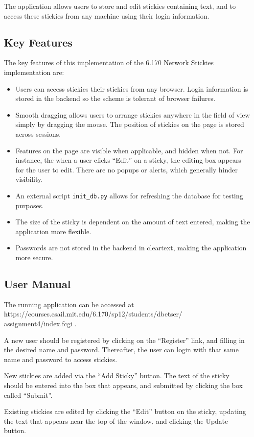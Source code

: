 \documentclass[11pt,letterpaper]{article}
\begin{document}
The application allows users to store and edit stickies containing text, and to access these stickies from any machine using their login information.

\subsection{Key Features}
The key features of this implementation of the 6.170 Network Stickies implementation are:
\begin{itemize}
\item Users can access stickies their stickies from any browser. Login information is stored in the backend so the scheme is tolerant of browser failures.
\item Smooth dragging allows users to arrange stickies anywhere in the field of view simply by dragging the mouse. The position of stickies on the page is stored across sessions.
\item Features on the page are visible when applicable, and hidden when not. For instance, the when a user clicks ``Edit'' on a sticky, the editing box appears for the user to edit. There are no popups or alerts, which generally hinder visibility.
\item An external script \texttt{init\_db.py} allows for refreshing the database for testing purposes.
\item The size of the sticky is dependent on the amount of text entered, making the application more flexible.
\item Passwords are not stored in the backend in cleartext, making the application more secure.
\end{itemize}

\subsection{User Manual}
The running application can be accessed at https://courses.csail.mit.edu/6.170/sp12/students/dbetser/
assignment4/index.fcgi .

A new user should be registered by clicking on the ``Register'' link, and filling in the desired name and password. Thereafter, the user can login with that same name and password to access stickies.

New stickies are added via the ``Add Sticky'' button. The text of the sticky should be entered into the box that appears, and submitted by clicking the box called ``Submit''.

Existing stickies are edited by clicking the ``Edit'' button on the sticky, updating the text that appears near the top of the window, and clicking the Update button.
\end{document}

